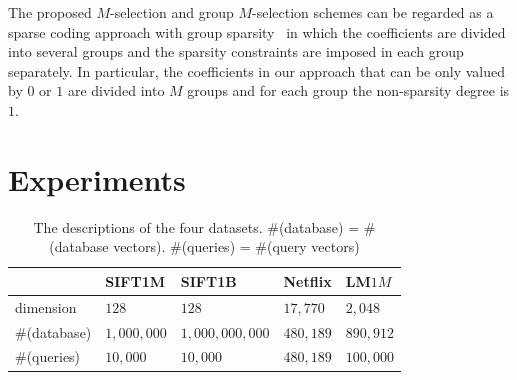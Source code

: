 \documentclass[10pt, letterpaper]{article}
\begin{document}
The proposed $M$-selection and group $M$-selection schemes
can be regarded as a sparse coding approach
with group sparsity~\cite{YuanL06} in which the coefficients
are divided into several groups
and the sparsity constraints are imposed in each group separately.
In particular,
the coefficients in our approach that can be only
valued by $0$ or $1$
are divided into $M$ groups
and for each group the non-sparsity degree is $1$.






\section{Experiments}
\setlength{\tabcolsep}{4pt}
\begin{table}[t]
\begin{center}
\caption{The descriptions of the four datasets. \#(database) =
\#(database vectors). \#(queries) = \#(query vectors)}
\label{tab:dataset}
\footnotesize
\begin{tabular}{l|llll}
\hline
& SIFT1M & SIFT1B & Netflix & LM$1M$ \\
\hline
dimension & $128$ & $128$ & $17,770$ & $2,048$ \\
\#(database) & $1,000,000$ & $1,000,000,000$ & $480,189$ & $890,912$ \\
\#(queries) & $10,000$ & $10,000$ & $480,189$ & $100,000$ \\
\hline
\end{tabular}
\vspace{-.5cm}
\end{center}
\end{table}
\setlength{\tabcolsep}{1.4pt}
\end{document}
